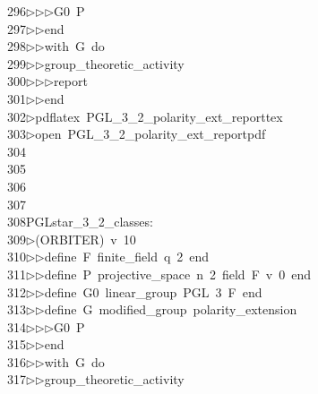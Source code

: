 \begin{tabbing}
296\>$\triangleright$\>$\triangleright$\>$\triangleright$\>G0\ P\ \\[0pt]
297\>$\triangleright$\>$\triangleright$\>end\ \\[0pt]
298\>$\triangleright$\>$\triangleright$\>with\ G\ do\ \\[0pt]
299\>$\triangleright$\>$\triangleright$\>group\_theoretic\_activity\ \\[0pt]
300\>$\triangleright$\>$\triangleright$\>$\triangleright$\>report\ \\[0pt]
301\>$\triangleright$\>$\triangleright$\>end\\[0pt]
302\>$\triangleright$\>pdflatex\ PGL\_3\_2\_polarity\_ext\_reporttex\\[0pt]
303\>$\triangleright$\>open\ PGL\_3\_2\_polarity\_ext\_reportpdf\\[0pt]
304\>\\[0pt]
305\>\\[0pt]
306\>\\[0pt]
307\>\\[0pt]
308\>PGLstar\_3\_2\_classes:\\[0pt]
309\>$\triangleright$\>(ORBITER)\ v\ 10\ \\[0pt]
310\>$\triangleright$\>$\triangleright$\>define\ F\ finite\_field\ q\ 2\ end\ \\[0pt]
311\>$\triangleright$\>$\triangleright$\>define\ P\ projective\_space\ n\ 2\ field\ F\ v\ 0\ end\ \\[0pt]
312\>$\triangleright$\>$\triangleright$\>define\ G0\ linear\_group\ PGL\ 3\ F\ end\ \\[0pt]
313\>$\triangleright$\>$\triangleright$\>define\ G\ modified\_group\ polarity\_extension\ \\[0pt]
314\>$\triangleright$\>$\triangleright$\>$\triangleright$\>G0\ P\ \\[0pt]
315\>$\triangleright$\>$\triangleright$\>end\ \\[0pt]
316\>$\triangleright$\>$\triangleright$\>with\ G\ do\ \\[0pt]
317\>$\triangleright$\>$\triangleright$\>group\_theoretic\_activity\ \\[0pt]

\end{tabbing}
